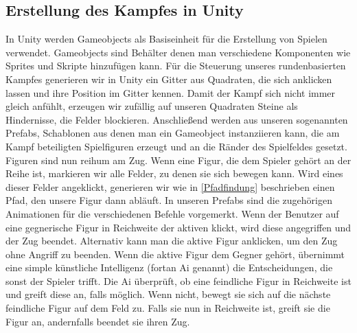 \documentclass[extern,palatino]{cgBA}
\begin{document}
\subsection{Erstellung des Kampfes in Unity}
In Unity werden Gameobjects als Basiseinheit für die Erstellung von Spielen verwendet. Gameobjects sind Behälter denen man verschiedene Komponenten wie Sprites und Skripte hinzufügen kann.%
Für die Steuerung unseres rundenbasierten Kampfes generieren wir in Unity ein Gitter aus Quadraten, die sich anklicken lassen und ihre Position im Gitter kennen. Damit der Kampf sich nicht immer gleich anfühlt, erzeugen wir zufällig auf unseren Quadraten Steine als Hindernisse, die Felder blockieren. Anschließend werden aus unseren sogenannten Prefabs, Schablonen aus denen man ein Gameobject instanziieren kann, die am Kampf beteiligten Spielfiguren erzeugt und an die Ränder des Spielfeldes gesetzt. Figuren sind nun reihum am Zug. Wenn eine Figur, die dem Spieler gehört an der Reihe ist, markieren wir alle Felder, zu denen sie sich bewegen kann. Wird eines dieser Felder angeklickt, generieren wir wie in \ref{Pfadfindung} beschrieben einen Pfad, den unsere Figur dann abläuft. In unseren Prefabs sind die zugehörigen Animationen für die verschiedenen Befehle vorgemerkt. Wenn der Benutzer auf eine gegnerische Figur in Reichweite der aktiven klickt, wird diese angegriffen und der Zug beendet. Alternativ kann man die aktive Figur anklicken, um den Zug ohne Angriff zu beenden. Wenn die aktive Figur dem Gegner gehört, übernimmt eine simple künstliche Intelligenz (fortan Ai genannt) die Entscheidungen, die sonst der Spieler trifft. Die Ai überprüft, ob eine feindliche Figur in Reichweite ist und greift diese an, falls möglich. Wenn nicht, bewegt sie sich auf die nächste feindliche Figur auf dem Feld zu. Falls sie nun in Reichweite ist, greift sie die Figur an, andernfalls beendet sie ihren Zug.
\end{document}
